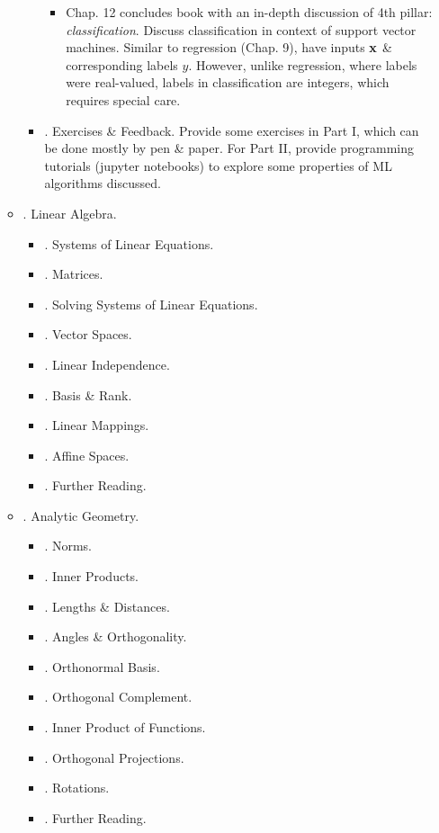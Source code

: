 \documentclass{article}
\begin{document}
\begin{enumerate}
\begin{itemize}
\begin{itemize}
\begin{itemize}
				\item Chap. 12 concludes book with an in-depth discussion of 4th pillar: {\it classification}. Discuss classification in context of support vector machines. Similar to regression (Chap. 9), have inputs ${\bf x}$ \& corresponding labels $y$. However, unlike regression, where labels were real-valued, labels in classification are integers, which requires special care.
			\end{itemize}
			\item {. Exercises \& Feedback.} Provide some exercises in Part I, which can be done mostly by pen \& paper. For Part II, provide programming tutorials (jupyter notebooks) to explore some properties of ML algorithms discussed.
		\end{itemize}
		\item {. Linear Algebra.}
		\begin{itemize}
			\item {. Systems of Linear Equations.}
			\item {. Matrices.}
			\item {. Solving Systems of Linear Equations.}
			\item {. Vector Spaces.}
			\item {. Linear Independence.}
			\item {. Basis \& Rank.}
			\item {. Linear Mappings.}
			\item {. Affine Spaces.}
			\item {. Further Reading.}
		\end{itemize}
		\item {. Analytic Geometry.}
		\begin{itemize}
			\item {. Norms.}
			\item {. Inner Products.}
			\item {. Lengths \& Distances.}
			\item {. Angles \& Orthogonality.}
			\item {. Orthonormal Basis.}
			\item {. Orthogonal Complement.}
			\item {. Inner Product of Functions.}
			\item {. Orthogonal Projections.}
			\item {. Rotations.}
			\item {. Further Reading.}

\end{itemize}
\end{itemize}
\end{enumerate}
\end{document}
